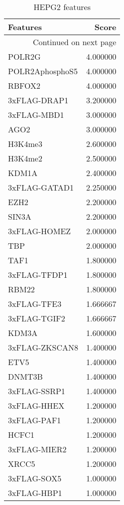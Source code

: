 \begin{longtable}{lr}
\caption{HEPG2 features}\\
\toprule
        Features &     Score \\
\midrule
\endhead
\midrule
\multicolumn{2}{r}{{Continued on next page}} \\
\midrule
\endfoot

\bottomrule
\endlastfoot
          POLR2G &  4.000000 \\
 POLR2AphosphoS5 &  4.000000 \\
          RBFOX2 &  4.000000 \\
    3xFLAG-DRAP1 &  3.200000 \\
     3xFLAG-MBD1 &  3.000000 \\
            AGO2 &  3.000000 \\
         H3K4me3 &  2.600000 \\
         H3K4me2 &  2.500000 \\
           KDM1A &  2.400000 \\
   3xFLAG-GATAD1 &  2.250000 \\
            EZH2 &  2.200000 \\
           SIN3A &  2.200000 \\
    3xFLAG-HOMEZ &  2.000000 \\
             TBP &  2.000000 \\
            TAF1 &  1.800000 \\
    3xFLAG-TFDP1 &  1.800000 \\
           RBM22 &  1.800000 \\
     3xFLAG-TFE3 &  1.666667 \\
    3xFLAG-TGIF2 &  1.666667 \\
           KDM3A &  1.600000 \\
  3xFLAG-ZKSCAN8 &  1.400000 \\
            ETV5 &  1.400000 \\
          DNMT3B &  1.400000 \\
    3xFLAG-SSRP1 &  1.400000 \\
     3xFLAG-HHEX &  1.200000 \\
     3xFLAG-PAF1 &  1.200000 \\
           HCFC1 &  1.200000 \\
    3xFLAG-MIER2 &  1.200000 \\
           XRCC5 &  1.200000 \\
     3xFLAG-SOX5 &  1.000000 \\
     3xFLAG-HBP1 &  1.000000 \\

\end{longtable}
